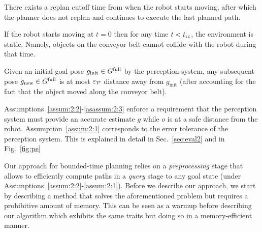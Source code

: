\documentclass[a4paper]{report}
\begin{document}
\vspace{2mm}
\begin{assumption} \label{assum:2:2} There exists a replan cutoff time \Trc from when the robot starts moving, after which the planner does not replan and continues to execute the last planned path.
\end{assumption}
\vspace{2mm}
\begin{assumption} \label{asassum:2:3} If the robot starts moving at $t = 0$ then for any time $t < t_{\textrm{rc}}$, the environment is static. Namely, objects on the conveyor belt cannot collide with the robot during that time.
\end{assumption}
\vspace{2mm}
\begin{assumption} \label{assum:2:1} Given an initial goal pose $g_{\textrm{init}} \in G^{\textrm{full}}$ by the perception system, any subsequent pose $g_{\textrm{new}} \in G^{\textrm{full}}$ is at most $\varepsilon_\mathcal{P}$ distance away from $g_{\textrm{init}}$ (after accounting for the fact that the object moved along the conveyor belt).
\end{assumption}    


Assumptions~\ref{assum:2:2}-\ref{asassum:2:3} enforce a requirement that the perception system must provide an accurate estimate $g$ while $o$ is at a safe distance from the robot.
%
Assumption~\ref{assum:2:1} corresponds to the error tolerance of the perception system. This is explained in detail in Sec.~\ref{sec:eval2} and in Fig.~\ref{fig:pe}




Our approach for bounded-time planning relies on a \emph{preprocessing} stage that allows to efficiently compute paths in a \emph{query} stage to any goal state (under Assumptions~\ref{assum:2:2}-\ref{assum:2:1}). 
%
Before we describe our approach, we start by describing a \naive method that solves the aforementioned problem but requires a prohibitive amount of memory.
%
This can be seen as a warmup before describing our algorithm which exhibits the same traits but doing so in a memory-efficient manner.
\end{document}
